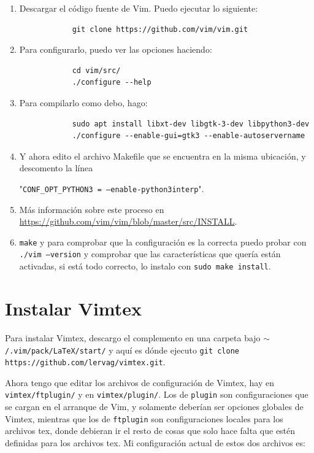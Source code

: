 \documentclass{article}
\begin{document}
    \begin{enumerate}
        \item Descargar el código fuente de Vim. Puedo ejecutar lo siguiente:
		\begin{verbatim}
		    git clone https://github.com/vim/vim.git
		\end{verbatim}
	\item Para configurarlo, puedo ver las opciones haciendo:
		\begin{verbatim}
		    cd vim/src/
		    ./configure --help
		\end{verbatim}
	\item Para compilarlo como debo, hago:
		\begin{verbatim}
		    sudo apt install libxt-dev libgtk-3-dev libpython3-dev
		    ./configure --enable-gui=gtk3 --enable-autoservername
		\end{verbatim}
	\item Y ahora edito el archivo Makefile que se encuentra en la misma ubicación, y descomento la línea

	"\texttt{CONF\_OPT\_PYTHON3 = --enable-python3interp}".

	\item Más información sobre este proceso en \href{https://github.com/vim/vim/blob/master/src/INSTALL}{https://github.com/vim/vim/blob/master/src/INSTALL}.
	
	\item \texttt{make} y para comprobar que la configuración es la correcta puedo probar con \texttt{./vim --version} y comprobar que las características que quería están activadas, si está todo correcto, lo instalo con \texttt{sudo make install}.
    \end{enumerate}
    \clearpage
    
    \section{Instalar Vimtex}
    Para instalar Vimtex, descargo el complemento en una carpeta bajo \texttt{$\sim$ /.vim/pack/LaTeX/start/} y aquí es dónde ejecuto \texttt{git clone https://github.com/lervag/vimtex.git}.

    Ahora tengo que editar los archivos de configuración de Vimtex, hay en \texttt{vimtex/ftplugin/} y en \texttt{vimtex/\-plugin/}. Los de \texttt{plugin} son configuraciones que se cargan en el arranque de Vim, y solamente deberían ser opciones globales de Vimtex, mientras que los de \texttt{ftplugin} son configuraciones locales para los archivos tex, donde debieran ir el resto de cosas que solo hace falta que estén definidas para los archivos tex. Mi configuración actual de estos dos archivos es:
\end{document}
